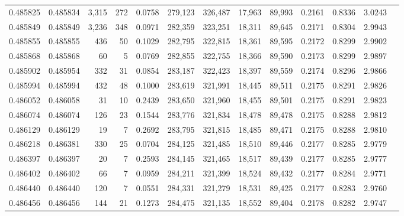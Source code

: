 \begin{tabular}{rrrrrrrrrrrrr}
0.485825 & 0.485834 & 3,315 &   272 &                                     0.0758 & 279,123 & 326,487 &  17,963 &  89,993 & 0.2161 & 0.8336 & 3.0243 \\
0.485849 & 0.485849 & 3,236 &   348 &                                     0.0971 & 282,359 & 323,251 &  18,311 &  89,645 & 0.2171 & 0.8304 & 2.9943 \\
0.485855 & 0.485855 &   436 &    50 &                                     0.1029 & 282,795 & 322,815 &  18,361 &  89,595 & 0.2172 & 0.8299 & 2.9902 \\
0.485868 & 0.485868 &    60 &     5 &                                     0.0769 & 282,855 & 322,755 &  18,366 &  89,590 & 0.2173 & 0.8299 & 2.9897 \\
0.485902 & 0.485954 &   332 &    31 &                                     0.0854 & 283,187 & 322,423 &  18,397 &  89,559 & 0.2174 & 0.8296 & 2.9866 \\
0.485994 & 0.485994 &   432 &    48 &                                     0.1000 & 283,619 & 321,991 &  18,445 &  89,511 & 0.2175 & 0.8291 & 2.9826 \\
0.486052 & 0.486058 &    31 &    10 &                                     0.2439 & 283,650 & 321,960 &  18,455 &  89,501 & 0.2175 & 0.8291 & 2.9823 \\
0.486074 & 0.486074 &   126 &    23 &                                     0.1544 & 283,776 & 321,834 &  18,478 &  89,478 & 0.2175 & 0.8288 & 2.9812 \\
0.486129 & 0.486129 &    19 &     7 &                                     0.2692 & 283,795 & 321,815 &  18,485 &  89,471 & 0.2175 & 0.8288 & 2.9810 \\
0.486218 & 0.486381 &   330 &    25 &                                     0.0704 & 284,125 & 321,485 &  18,510 &  89,446 & 0.2177 & 0.8285 & 2.9779 \\
0.486397 & 0.486397 &    20 &     7 &                                     0.2593 & 284,145 & 321,465 &  18,517 &  89,439 & 0.2177 & 0.8285 & 2.9777 \\
0.486402 & 0.486402 &    66 &     7 &                                     0.0959 & 284,211 & 321,399 &  18,524 &  89,432 & 0.2177 & 0.8284 & 2.9771 \\
0.486440 & 0.486440 &   120 &     7 &                                     0.0551 & 284,331 & 321,279 &  18,531 &  89,425 & 0.2177 & 0.8283 & 2.9760 \\
0.486456 & 0.486456 &   144 &    21 &                                     0.1273 & 284,475 & 321,135 &  18,552 &  89,404 & 0.2178 & 0.8282 & 2.9747 \\

\end{tabular}
